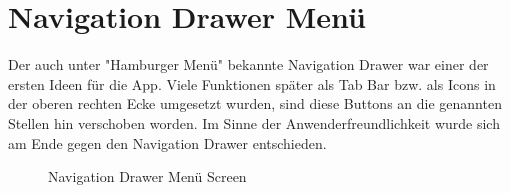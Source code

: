 \documentclass[
    DIV12,
    cleardouble=plain,
    headings=normal,
    pdftex,
    headexclude,footexclude,
    final
]{scrreprt}
\begin{document}
\section{Navigation Drawer Menü}
Der auch unter "Hamburger Menü" bekannte Navigation Drawer war einer der ersten Ideen für die App. Viele Funktionen später als Tab Bar bzw. als Icons in der oberen rechten Ecke umgesetzt wurden, sind diese Buttons an die genannten Stellen hin verschoben worden. Im Sinne der Anwenderfreundlichkeit wurde sich am Ende gegen den Navigation Drawer entschieden.
\begin{figure}[H]
	\centering
	\caption{Navigation Drawer Menü Screen}
	\label{main_burger}
\end{figure}
\end{document}
